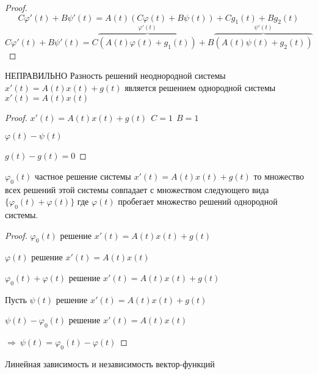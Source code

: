 \begin{proof}
  $$
  C\varphi'(t) + B\psi'(t) = A(t)(C\varphi(t) + B\psi(t)) + Cg_1(t) +
  Bg_2(t)
  $$
  $$
  C\varphi'(t) + B\psi'(t) =
  C \overbrace{(A(t)\varphi(t) + g_1(t))}^{\varphi'(t)}+
  B \overbrace{(A(t)\psi(t) + g_2(t))}^{\psi'(t)}
  $$
\end{proof}

\begin{block}[Следствие 1]
НЕПРАВИЛЬНО
  Разность решений неоднородной системы $x'(t) = A(t)x(t) + g(t)$
  является решением однородной системы $x'(t) = A(t)x(t)$
\end{block}

\begin{proof}
  $x'(t) = A(t)x(t) + g(t) ~~ C = 1 ~~ B = 1$

  $\varphi(t) - \psi(t)$

  $g(t) - g(t) = 0$
\end{proof}

\begin{block}[Слeдствие 2]
  $\varphi_0(t)$ частное решение системы $x'(t) = A(t)x(t) + g(t)$ то
  множество всех решений этой системы совпадает с множеством следующего вида
  $\{\varphi_0(t) + \varphi(t)\}$ где $\varphi(t)$ пробегает множество решений
  однородной системы.
\end{block}

\begin{proof}
  $\varphi_0(t)$ решение $x'(t) = A(t)x(t) + g(t)$

  $\varphi(t)$ решение $x'(t) = A(t)x(t)$

  $\varphi_0(t) + \varphi(t)$ решение $x'(t) = A(t)x(t) + g(t)$

  Пусть $\psi(t)$ решение $x'(t) = A(t)x(t) + g(t)$

  $\psi(t) - \varphi_0(t)$ решение $x'(t) = A(t)x(t)$

  $\Rightarrow ~ \psi(t) = \varphi_0(t) - \varphi(t)$
\end{proof}

\begin{title}[\Large]
  Линейная зависимость и независимость вектор-функций
\end{title}


